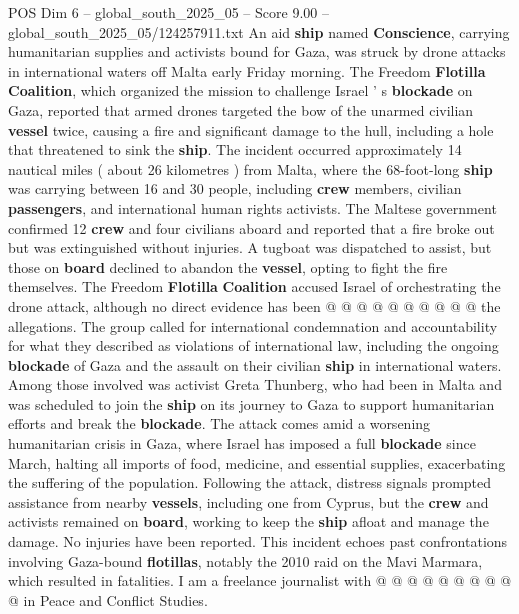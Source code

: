 \begin{textsample}{POS Dim 6 – global\_south\_2025\_05 – Score 9.00 – global\_south\_2025\_05/124257911.txt}  \label{ex:f6_pos_036}
An aid \textbf{ship} named \textbf{Conscience}, carrying humanitarian supplies and activists bound for Gaza, was struck by drone attacks in international waters off Malta early Friday morning.
The Freedom \textbf{Flotilla} \textbf{Coalition}, which organized the mission to challenge Israel ' s \textbf{blockade} on Gaza, reported that armed drones targeted the bow of the unarmed civilian \textbf{vessel} twice, causing a fire and significant damage to the hull, including a hole that threatened to sink the \textbf{ship}.
The incident occurred approximately 14 nautical miles ( about 26 kilometres ) from Malta, where the 68-foot-long \textbf{ship} was carrying between 16 and 30 people, including \textbf{crew} members, civilian \textbf{passengers}, and international human rights activists.
The Maltese government confirmed 12 \textbf{crew} and four civilians aboard and reported that a fire broke out but was extinguished without injuries.
A tugboat was dispatched to assist, but those on \textbf{board} declined to abandon the \textbf{vessel}, opting to fight the fire themselves.
The Freedom \textbf{Flotilla} \textbf{Coalition} accused Israel of orchestrating the drone attack, although no direct evidence has been @ @ @ @ @ @ @ @ @ @ the allegations.
The group called for international condemnation and accountability for what they described as violations of international law, including the ongoing \textbf{blockade} of Gaza and the assault on their civilian \textbf{ship} in international waters.
Among those involved was activist Greta Thunberg, who had been in Malta and was scheduled to join the \textbf{ship} on its journey to Gaza to support humanitarian efforts and break the \textbf{blockade}.
The attack comes amid a worsening humanitarian crisis in Gaza, where Israel has imposed a full \textbf{blockade} since March, halting all imports of food, medicine, and essential supplies, exacerbating the suffering of the population.
Following the attack, distress signals prompted assistance from nearby \textbf{vessels}, including one from Cyprus, but the \textbf{crew} and activists remained on \textbf{board}, working to keep the \textbf{ship} afloat and manage the damage.
No injuries have been reported.
This incident echoes past confrontations involving Gaza-bound \textbf{flotillas}, notably the 2010 raid on the Mavi Marmara, which resulted in fatalities.
I am a freelance journalist with @ @ @ @ @ @ @ @ @ @ in Peace and Conflict Studies.

\end{textsample}
